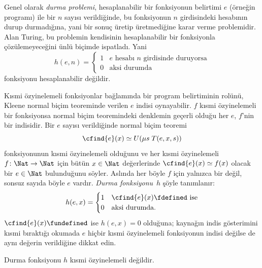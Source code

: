 


Genel olarak \emph{durma problemi}, hesaplanabilir bir fonksiyonun belirtimi
$e$ (örneğin programı) ile bir $n$ sayısı verildiğinde, bu fonksiyonun $n$
girdisindeki hesabının durup durmadığına, yani bir sonuç üretip üretmediğine
karar verme problemidir. Alan Turing, bu problemin kendisinin hesaplanabilir
bir fonksiyonla çözülemeyeceğini ünlü biçimde ispatladı. Yani
\[
  h(e,n)=\begin{cases}
    1 & \text{$e$ hesabı $n$ girdisinde duruyorsa}\\
    0 & \text{aksi durumda}
  \end{cases}
\]
fonksiyonu hesaplanabilir değildir.

Kısmi özyinelemeli fonksiyonlar bağlamında bir program belirtiminin rolünü,
Kleene normal biçim teoreminde verilen $e$ indisi oynayabilir. $f$ kısmi
özyinelemeli bir fonksiyonsa normal biçim teoremindeki denklemin geçerli
olduğu her $e$, $f$'nin bir indisidir. Bir $e$ sayısı verildiğinde normal
biçim teoremi
\[
  \cfind{e}(x)\simeq U(\mu s\;T(e,x,s))
\]
fonksiyonunun kısmi özyinelemeli olduğunu ve her kısmi özyinelemeli
$f\colon\Nat\to\Nat$ için bütün $x\in\Nat$ değerlerinde
$\cfind{e}(x)\simeq f(x)$ olacak bir $e\in\Nat$ bulunduğunu söyler. Aslında
her böyle $f$ için yalnızca bir değil, sonsuz sayıda böyle $e$ vardır.
\emph{Durma fonksiyonu}~$h$ şöyle tanımlanır:
\[
  h(e,x)=\begin{cases}
    1 & \text{$\cfind{e}(x)\fdefined$ ise}\\
    0 & \text{aksi durumda.}
  \end{cases}
\]
$\cfind{e}(x)\fundefined$ ise $h(e,x)=0$ olduğuna; kaynağın indis
gösterimini kısmi bıraktığı okumada $e$ hiçbir kısmi özyinelemeli fonksiyonun
indisi değilse de aynı değerin verildiğine dikkat edin.

\begin{thm}
Durma fonksiyonu $h$ kısmi özyinelemeli değildir.
\end{thm}


